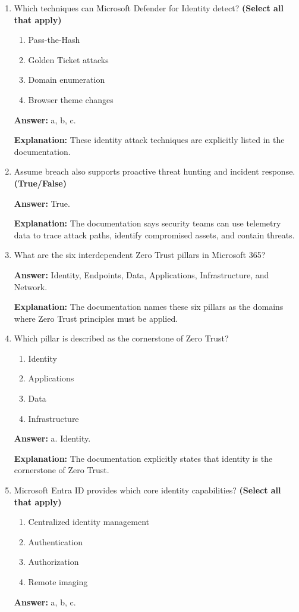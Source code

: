 \documentclass[10pt]{article}
\begin{document}
\begin{enumerate}[leftmargin=*]
\textbf{Explanation:} This is the exact cross-domain example used to describe Sentinel’s correlation capabilities.

\item Which techniques can Microsoft Defender for Identity detect? \textbf{(Select all that apply)}
\begin{enumerate}[label=\alph*., leftmargin=1.5em]
\item Pass-the-Hash
\item Golden Ticket attacks
\item Domain enumeration
\item Browser theme changes
\end{enumerate}
\textbf{Answer:} a, b, c.

\textbf{Explanation:} These identity attack techniques are explicitly listed in the documentation.

\item Assume breach also supports proactive threat hunting and incident response. \textbf{(True/False)}

\textbf{Answer:} True.

\textbf{Explanation:} The documentation says security teams can use telemetry data to trace attack paths, identify compromised assets, and contain threats.

\item What are the six interdependent Zero Trust pillars in Microsoft 365?

\textbf{Answer:} Identity, Endpoints, Data, Applications, Infrastructure, and Network.

\textbf{Explanation:} The documentation names these six pillars as the domains where Zero Trust principles must be applied.

\item Which pillar is described as the cornerstone of Zero Trust?
\begin{enumerate}[label=\alph*., leftmargin=1.5em]
\item Identity
\item Applications
\item Data
\item Infrastructure
\end{enumerate}
\textbf{Answer:} a. Identity.

\textbf{Explanation:} The documentation explicitly states that identity is the cornerstone of Zero Trust.

\item Microsoft Entra ID provides which core identity capabilities? \textbf{(Select all that apply)}
\begin{enumerate}[label=\alph*., leftmargin=1.5em]
\item Centralized identity management
\item Authentication
\item Authorization
\item Remote imaging
\end{enumerate}
\textbf{Answer:} a, b, c.


\end{enumerate}
\end{document}
